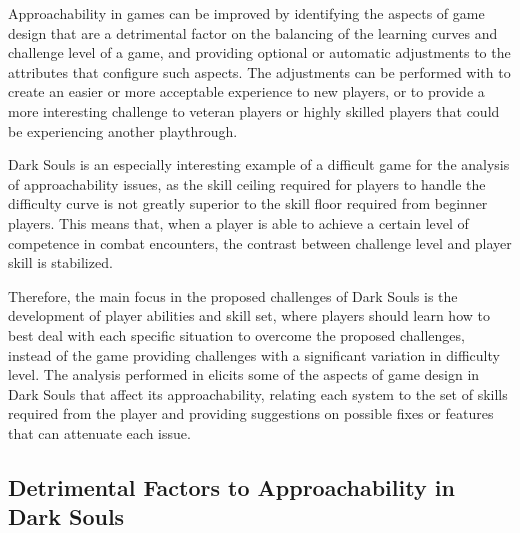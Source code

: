 Approachability in games can be improved by identifying the aspects of game design that are a detrimental factor on the balancing of the learning curves and challenge level of a game, and providing optional or automatic adjustments to the attributes that configure such aspects. The adjustments can be performed with to create an easier or more acceptable experience to new players, or to provide a more interesting challenge to veteran players or highly skilled players that could be experiencing another playthrough.

Dark Souls is an especially interesting example of a difficult game for the analysis of  approachability issues, as the skill ceiling required for players to handle the difficulty curve is not greatly superior to the skill floor required from beginner players. This means that, when a player is able to achieve a certain level of competence in combat encounters, the contrast between challenge level and player skill is stabilized.

Therefore, the main focus in the proposed challenges of Dark Souls is the development of player abilities and skill set, where players should learn how to best deal with each specific situation to overcome the proposed challenges, instead of the game providing challenges with a significant variation in difficulty level. The analysis performed in \cite{ONLINE_ApproachabilityFixDarkSouls} elicits some of the aspects of game design in Dark Souls that affect its approachability, relating each system to the set of skills required from the player and providing suggestions on possible fixes or features that can attenuate each issue.

\subsection{Detrimental Factors to Approachability in Dark Souls}
\label{sec:detrimental-factors-approachability}



